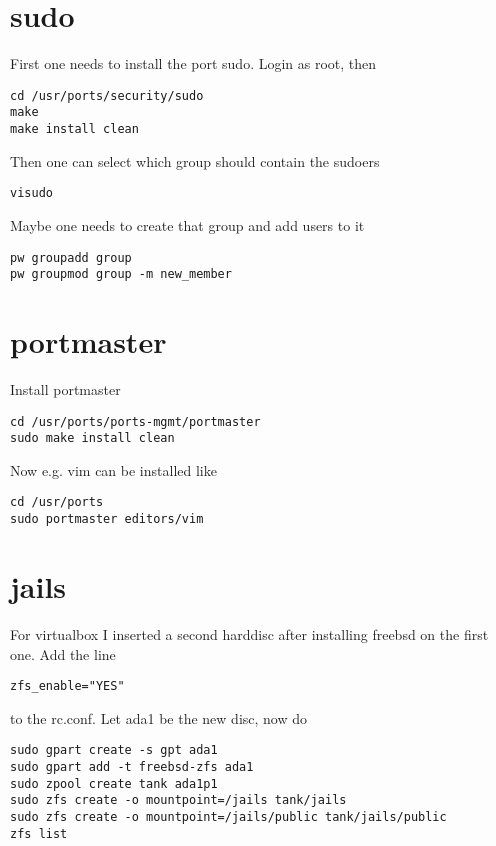 \documentclass[a4paper]{article}
\begin{document}
\section{sudo}

First one needs to install the port sudo. Login as root, then

\begin{verbatim}
cd /usr/ports/security/sudo
make
make install clean
\end{verbatim}

Then one can select which group should contain the sudoers

\begin{verbatim}
visudo
\end{verbatim}

Maybe one needs to create that group and add users to it

\begin{verbatim}
pw groupadd group
pw groupmod group -m new_member
\end{verbatim}


\section{portmaster}
Install portmaster

\begin{verbatim}
cd /usr/ports/ports-mgmt/portmaster
sudo make install clean
\end{verbatim}

Now e.g. vim can be installed like

\begin{verbatim}
cd /usr/ports
sudo portmaster editors/vim
\end{verbatim}

\section{jails}
For virtualbox I inserted a second harddisc after installing freebsd on the first one.
Add the line

\begin{verbatim}
zfs_enable="YES"
\end{verbatim}

to the rc.conf.
Let ada1 be the new disc, now do

\begin{verbatim}
sudo gpart create -s gpt ada1
sudo gpart add -t freebsd-zfs ada1
sudo zpool create tank ada1p1
sudo zfs create -o mountpoint=/jails tank/jails
sudo zfs create -o mountpoint=/jails/public tank/jails/public
zfs list
\end{verbatim}
\end{document}
